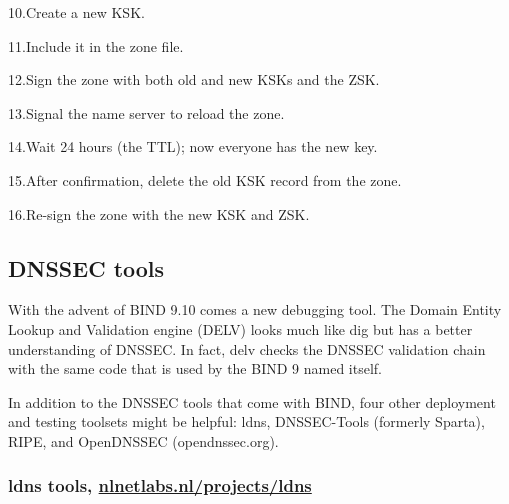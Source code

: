 {10.}Create a new KSK.

{11.}Include it in the zone file.

{12.}Sign the zone with both old and new KSKs and the ZSK.

{13.}Signal the name server to reload the zone.

{14.}Wait 24 hours (the TTL); now everyone has the new key.

{15.}After confirmation, delete the old KSK record from the zone.

{16.}Re-sign the zone with the new KSK and ZSK.

\protect\hypertarget{part0024_split_067.html}{}{}

\hypertarget{part0024_split_067.htmlux5cux23_idContainer1069}{}
\hypertarget{part0024_split_067.htmlux5cux23calibre_pb_66}{%
\subsection[DNSSEC
tools]{\texorpdfstring{\protect\hypertarget{part0024_split_067.htmlux5cux23_idTextAnchor948}{}{}DNSSEC
tools}{DNSSEC tools}}\label{part0024_split_067.htmlux5cux23calibre_pb_66}}

With the advent of BIND 9.10 comes a new debugging tool. The Domain
Entity Lookup and Validation engine (DELV) looks much like {dig} but has
a better understanding of DNSSEC. In fact,
\protect\hypertarget{part0024_split_067.htmlux5cux23_idIndexMarker2271}{}{}\protect\hypertarget{part0024_split_067.htmlux5cux23_idIndexMarker2272}{}{}\protect\hypertarget{part0024_split_067.htmlux5cux23_idIndexMarker2273}{}{}\protect\hypertarget{part0024_split_067.htmlux5cux23_idIndexMarker2274}{}{}{delv
}checks the DNSSEC validation chain with the same code that is used by
the BIND 9 {named} itself.

In addition to the DNSSEC tools that come with BIND, four other
deployment and testing toolsets might be helpful: {ldns}, DNSSEC-Tools
(formerly Sparta), RIPE, and OpenDNSSEC (opendnssec.org).

\subsubsection[ tools,
\href{http://nlnetlabs.nl/projects/ldns}{nlnetlabs.nl/projects/ldns}]{\texorpdfstring{{\protect\hypertarget{part0024_split_067.htmlux5cux23_idTextAnchor949}{}{}ldns}
tools,
\href{http://nlnetlabs.nl/projects/ldns}{nlnetlabs.nl/projects/ldns}}{ldns tools, nlnetlabs.nl/projects/ldns}}

